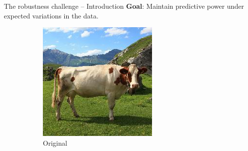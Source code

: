 
\begin{frame}
    \centering
    \Huge{\insertsection}  %
\end{frame}

\begin{frame}{The robustness challenge -- Introduction}
	\textbf{Goal}: Maintain predictive power under 
	expected variations in the data.
	
	\begin{figure}
		\centering
		\begin{subfigure}[b]{0.22\textwidth}
			\centering
			\includegraphics[width=\textwidth]{img/introduction/cow_original.jpg}
			\caption{Original}
		\end{subfigure}
		\hfill
		\begin{subfigure}[b]{0.22\textwidth}
			\centering

\end{subfigure}
\end{figure}
\end{frame}
